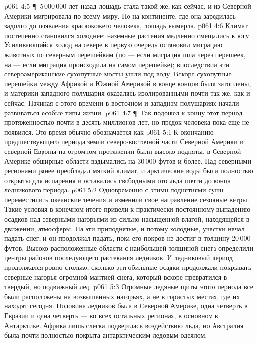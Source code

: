 \vs p061 4:5 \P\ 5\,000\,000 лет назад лошадь стала такой же, как сейчас, и из Северной Америки мигрировала по всему миру. Но на континенте, где она зародилась задолго до появления краснокожего человека, лошадь вымерла.
\vs p061 4:6 Климат постепенно становился холоднее; наземные растения медленно смещались к югу. Усиливающийся холод на севере в первую очередь остановил миграцию животных по северным перешейкам (по --- если миграция шла через перешеек, на --- если миграция происходила на самом перешейке); впоследствии эти североамериканские сухопутные мосты ушли под воду. Вскоре сухопутные перешейки между Африкой и Южной Америкой в конце концов были затоплены, и материки западного полушария оказались изолированными почти так же, как и сейчас. Начиная с этого времени в восточном и западном полушариях начали развиваться особые типы жизни.
\vs p061 4:7 \P\ Так подошел к концу этот период протяженностью почти в десять миллионов лет, но предок человека пока еще не появился. Это время обычно обозначается как 
\vs p061 5:1 К окончанию предшествующего периода земли северо\hyp{}восточной части Северной Америки и северной Европы на огромном протяжении были высоко подняты, в Северной Америке обширные области вздымались на 30\,000 футов и более. Над северными регионами ранее преобладал мягкий климат, и арктические воды были полностью открыты для испарения и оставались свободными ото льда почти до конца ледникового периода.
\vs p061 5:2 Одновременно с этими поднятиями суши переместились океанские течения и изменили свое направление сезонные ветры. Такие условия в конечном итоге привели к практически постоянному выпадению осадков над северными нагорьями из сильно насыщенной влагой, находящейся в движении, атмосферы. На эти приподнятые, и потому холодные, участки начал падать снег, и он продолжал падать, пока его покров не достиг в толщину 20\,000 футов. Высоко расположенные области с наибольшей толщиной снега определили центры районов последующего растекания ледников. И ледниковый период продолжался ровно столько, сколько эти обильные осадки продолжали покрывать северные нагорья огромной мантией снега, который вскоре превратился в твердый, но подвижный лед.
\vs p061 5:3 Огромные ледяные щиты этого периода все были расположены на возвышенных нагорьях, а не в гористых местах, где их находят сегодня. Половина ледников была в Северной Америке, одна четверть в Евразии и одна четверть --- во всех остальных регионах, в основном в Антарктике. Африка лишь слегка подверглась воздействию льда, но Австралия была почти полностью покрыта антарктическим ледовым одеялом.
